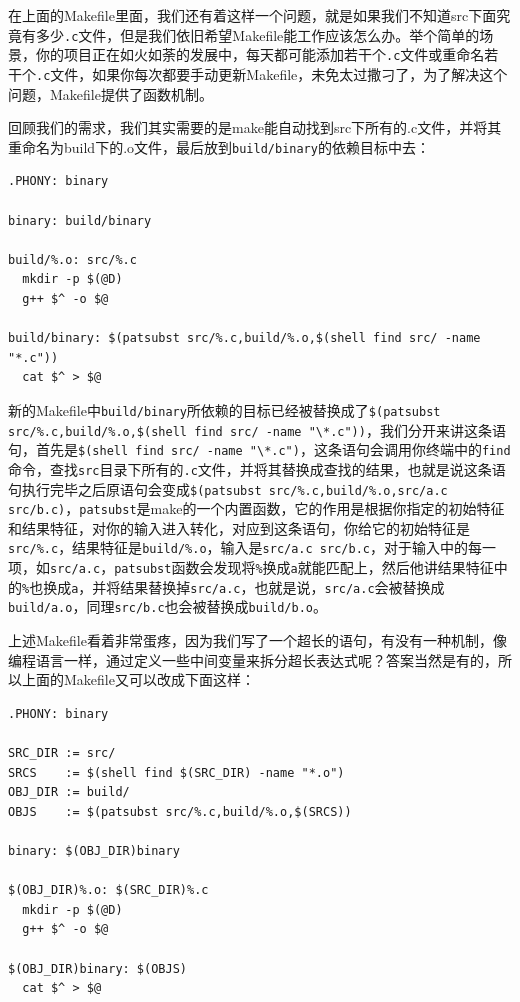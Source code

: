 \documentclass[lang=cn,11pt,a4paper]{elegantpaper}
\begin{document}
在上面的Makefile里面，我们还有着这样一个问题，就是如果我们不知道src下面究竟有多少\lstinline!.c!文件，但是我们依旧希望Makefile能工作应该怎么办。举个简单的场景，你的项目正在如火如荼的发展中，每天都可能添加若干个\lstinline!.c!文件或重命名若干个\lstinline!.c!文件，如果你每次都要手动更新Makefile，未免太过撒刁了，为了解决这个问题，Makefile提供了函数机制。

回顾我们的需求，我们其实需要的是make能自动找到src下所有的.c文件，并将其重命名为build下的.o文件，最后放到\lstinline!build/binary!的依赖目标中去：

\begin{lstlisting}
.PHONY: binary

binary: build/binary

build/%.o: src/%.c
  mkdir -p $(@D)
  g++ $^ -o $@

build/binary: $(patsubst src/%.c,build/%.o,$(shell find src/ -name "*.c"))
  cat $^ > $@
\end{lstlisting}

新的Makefile中\lstinline!build/binary!所依赖的目标已经被替换成了\lstinline!$(patsubst src/%.c,build/%.o,$(shell find src/ -name "\*.c"))!，我们分开来讲这条语句，首先是\lstinline!$(shell find src/ -name "\*.c")!，这条语句会调用你终端中的\lstinline!find!命令，查找\lstinline!src!目录下所有的\lstinline!.c!文件，并将其替换成查找的结果，也就是说这条语句执行完毕之后原语句会变成\lstinline!$(patsubst src/%.c,build/%.o,src/a.c src/b.c)!，\lstinline!patsubst!是make的一个内置函数，它的作用是根据你指定的初始特征和结果特征，对你的输入进入转化，对应到这条语句，你给它的初始特征是\lstinline!src/%.c!，结果特征是\lstinline!build/%.o!，输入是\lstinline!src/a.c src/b.c!，对于输入中的每一项，如\lstinline!src/a.c!，\lstinline!patsubst!函数会发现将\lstinline!%!换成\lstinline!a!就能匹配上，然后他讲结果特征中的\lstinline!%!也换成\lstinline!a!，并将结果替换掉\lstinline!src/a.c!，也就是说，\lstinline!src/a.c!会被替换成\lstinline!build/a.o!，同理\lstinline!src/b.c!也会被替换成\lstinline!build/b.o!。

上述Makefile看着非常蛋疼，因为我们写了一个超长的语句，有没有一种机制，像编程语言一样，通过定义一些中间变量来拆分超长表达式呢？答案当然是有的，所以上面的Makefile又可以改成下面这样：

\begin{lstlisting}
.PHONY: binary

SRC_DIR := src/
SRCS    := $(shell find $(SRC_DIR) -name "*.o")
OBJ_DIR := build/
OBJS    := $(patsubst src/%.c,build/%.o,$(SRCS))

binary: $(OBJ_DIR)binary

$(OBJ_DIR)%.o: $(SRC_DIR)%.c
  mkdir -p $(@D)
  g++ $^ -o $@

$(OBJ_DIR)binary: $(OBJS)
  cat $^ > $@
\end{lstlisting}
\end{document}
